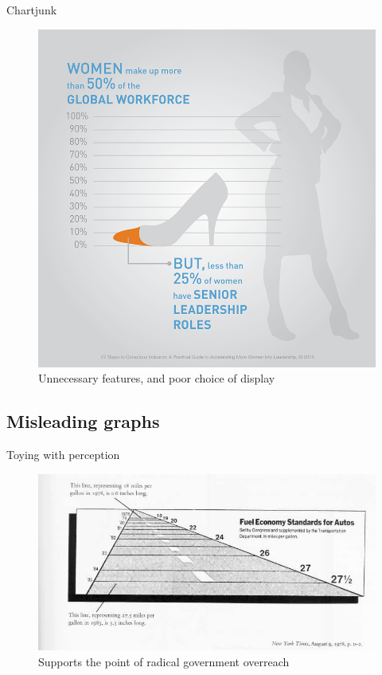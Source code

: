 \documentclass[12pt,english,pdf,dvipsnames,handout]{beamer}
\begin{document}
\begin{frame}{Chartjunk}
	
	\begin{figure}
		\centering
		\includegraphics[scale=0.25]{../04-graphs/36_WEF_women_leadership}
		\caption{Unnecessary features, and poor choice of display}
	\end{figure}
	
\end{frame}


\subsection{Misleading graphs}

\begin{frame}{Toying with perception}

\begin{figure}
  \centering
  \includegraphics[scale=0.45]{../04-graphs/12_Fuel_economy}
  \caption{Supports the point of radical government overreach}
\end{figure}

\end{frame}
\end{document}
